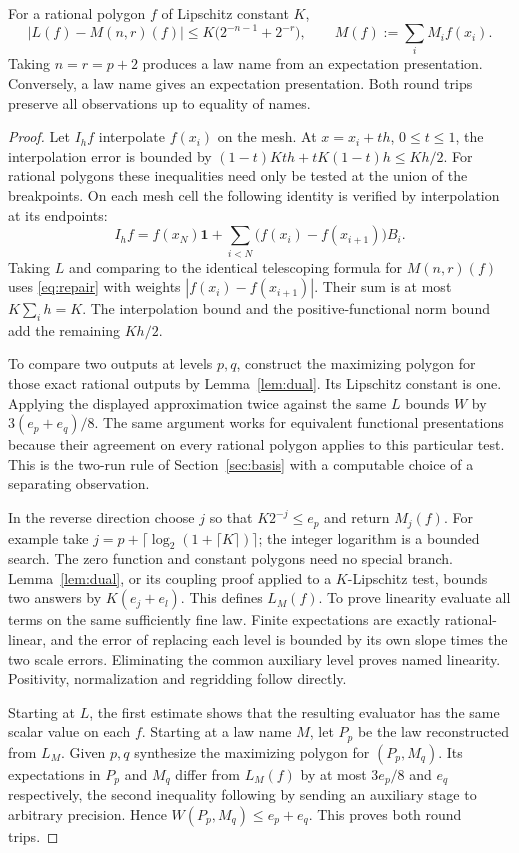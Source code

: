 \begin{theorem}\label{thm:law}
For a rational polygon $f$ of Lipschitz constant $K$,
\[
 \big| L(f)-M(n,r)(f)\big|\le K\bigl(2^{-n-1}+2^{-r}\bigr),
 \qquad M(f):=\sum_i M_i f(x_i).
\]
Taking $n=r=p+2$ produces a law name from an expectation presentation. Conversely,
a law name gives an expectation presentation. Both round trips preserve
all observations up to equality of names.
\end{theorem}
\begin{proof}
Let $I_h f$ interpolate $f(x_i)$ on the mesh. At $x=x_i+th$, $0\le t\le1$,
the interpolation error is bounded by
$(1-t)Kth+tK(1-t)h\le Kh/2$. For rational polygons these inequalities need
only be tested at the union of the breakpoints. On each mesh cell the following
identity is verified by interpolation at its endpoints:
\[
 I_hf=f(x_N)\mathbf 1+
              \sum_{i<N}\big(f(x_i)-f(x_{i+1})\big)B_i.
\]
Taking $L$ and comparing to the identical telescoping formula for $M(n,r)(f)$
uses \eqref{eq:repair} with weights $|f(x_i)-f(x_{i+1})|$. Their sum is at
most $K\sum_i h=K$. The interpolation bound and the positive-functional norm
bound add the remaining $Kh/2$.

To compare two outputs at levels $p,q$, construct the maximizing polygon for
those exact rational outputs by Lemma~\ref{lem:dual}. Its Lipschitz constant
is one. Applying the displayed approximation twice against the same $L$
bounds $W$ by $3(e_p+e_q)/8$. The same argument works for equivalent
functional presentations because their agreement on every rational polygon applies to this particular test. This is
the two-run rule of Section~\ref{sec:basis} with a computable choice of a
separating observation.

In the reverse direction choose $j$ so that $K2^{-j}\le e_p$ and return
$M_j(f)$. For example take $j=p+\lceil\log_2(1+\lceil K\rceil)\rceil$;
the integer logarithm is a bounded search. The zero function and constant
polygons need no special branch. Lemma~\ref{lem:dual}, or its coupling proof
applied to a $K$-Lipschitz test, bounds two answers by $K(e_j+e_l)$.
This defines $L_M(f)$. To prove linearity evaluate all terms on the
same sufficiently fine law. Finite expectations are exactly rational-linear,
and the error of replacing each level is bounded by its own slope times
the two scale errors. Eliminating the common auxiliary level proves named
linearity. Positivity, normalization and regridding follow directly.

Starting at $L$, the first estimate shows that the resulting evaluator has
the same scalar value on each $f$. Starting at a law name $M$, let $P_p$
be the law reconstructed from $L_M$. Given $p,q$ synthesize the maximizing
polygon for $(P_p,M_q)$. Its expectations in $P_p$ and $M_q$ differ from
$L_M(f)$ by at most $3e_p/8$ and $e_q$ respectively, the second inequality
following by sending an auxiliary stage to arbitrary precision. Hence
$W(P_p,M_q)\le e_p+e_q$. This proves both round trips.
\end{proof}

